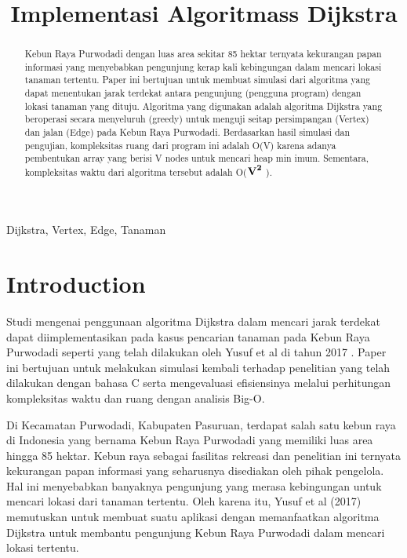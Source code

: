 \documentclass[conference]{IEEEtran}
\title{Implementasi Algoritmass Dijkstra}
\author{\IEEEauthorblockN{Rani Isramiharti}
\IEEEauthorblockA{\textit{School of Electrical Engineering and Informatics}\\
\textit{Institut Teknologi Bandung}\\
Bandung, Indonesia\\
email: 13220003@std.stei.itb.ac.id}
}
\begin{document}
\maketitle
\begin{abstract}
Kebun Raya Purwodadi dengan luas area sekitar 85 hektar ternyata kekurangan papan informasi yang menyebabkan pengunjung kerap kali kebingungan dalam mencari lokasi tanaman tertentu. Paper ini bertujuan untuk membuat simulasi dari algoritma yang dapat menentukan jarak terdekat antara pengunjung (pengguna program) dengan lokasi tanaman yang dituju. Algoritma yang digunakan adalah algoritma Dijkstra yang beroperasi secara menyeluruh (greedy) untuk menguji seitap persimpangan (Vertex) dan jalan (Edge) pada Kebun Raya Purwodadi. Berdasarkan hasil simulasi dan pengujian, kompleksitas ruang dari program ini adalah O(V) karena adanya pembentukan array yang berisi V nodes untuk mencari heap min imum. Sementara, kompleksitas waktu dari algoritma tersebut adalah O($\textbf V^\textbf2$ ).
\end{abstract}

\begin{IEEEkeywords}
Dijkstra, Vertex, Edge, Tanaman
\end{IEEEkeywords}

\section{Introduction}
	Studi mengenai penggunaan algoritma Dijkstra dalam mencari jarak terdekat dapat diimplementasikan pada kasus pencarian tanaman pada Kebun Raya Purwodadi seperti yang telah dilakukan oleh Yusuf et al di tahun 2017\cite{yusuf2017implementasi} . Paper ini bertujuan untuk melakukan simulasi kembali terhadap penelitian yang telah dilakukan dengan bahasa C serta mengevaluasi efisiensinya melalui perhitungan kompleksitas waktu dan ruang dengan analisis Big-O.

	Di Kecamatan Purwodadi, Kabupaten Pasuruan, terdapat salah satu kebun raya di Indonesia yang bernama Kebun Raya Purwodadi yang memiliki luas area hingga 85 hektar. Kebun raya sebagai fasilitas rekreasi dan penelitian ini ternyata kekurangan papan informasi yang seharusnya disediakan oleh pihak pengelola. Hal ini menyebabkan banyaknya pengunjung yang merasa kebingungan untuk mencari lokasi dari tanaman tertentu. Oleh karena itu, Yusuf et al (2017) memutuskan untuk membuat suatu aplikasi dengan memanfaatkan algoritma Dijkstra untuk membantu pengunjung Kebun Raya Purwodadi dalam mencari lokasi tertentu.
\end{document}
